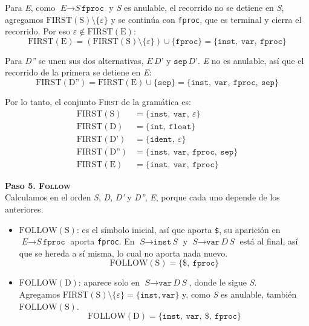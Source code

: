 \documentclass[12pt,letterpaper]{article}
\newcommand{\nt}[1]{\textit{#1}}
\newcommand{\tk}[1]{\texttt{#1}}
\newcommand{\tx}[1]{\text{#1}}
\newcommand{\First}[1]{\mathrm{FIRST}(#1)}
\newcommand{\Follow}[1]{\mathrm{FOLLOW}(#1)}
\newcommand{\eps}{\varepsilon}
\begin{document}
\begin{enumerate}[label=\arabic*.]
\begin{itemize}
    Para \nt{E}, como $\nt{E}\to\nt{S}\,\tk{fproc}$ y \nt{S} es anulable, el recorrido no se detiene en
    \nt{S}, agregamos $\First{\tx{S}}\setminus\{\eps\}$ y se continúa con \tk{fproc}, que es terminal y cierra
    el recorrido. Por eso $\eps\notin\First{\tx{E}}$:
    \[
    \First{\tx{E}} = (\First{\tx{S}}\setminus\{\eps\}) \cup \{\tk{fproc}\} = \{\tk{inst},\ \tk{var},\ \tk{fproc}\}
    \]
    
    Para \nt{D''} se unen sus dos alternativas, $\nt{E}\,\nt{D'}$ y $\tk{sep}\,\nt{D'}$. \nt{E} no es
    anulable, así que el recorrido de la primera se detiene en \nt{E}:
    \[
    \First{\tx{D''}} = \First{\tx{E}} \cup \{\tk{sep}\} = \{\tk{inst},\ \tk{var},\ \tk{fproc},\ \tk{sep}\}
    \]

    Por lo tanto, el conjunto \textsc{First} de la gramática es:
    \[
    \begin{aligned}
      \First{\tx{S}}   &= \{\tk{inst},\ \tk{var},\ \eps\} \\
      \First{\tx{D}}   &= \{\tk{int},\ \tk{float}\} \\
      \First{\tx{D'}}  &= \{\tk{ident},\ \eps\} \\
      \First{\tx{D''}} &= \{\tk{inst},\ \tk{var},\ \tk{fproc},\ \tk{sep}\} \\
      \First{\tx{E}}   &= \{\tk{inst},\ \tk{var},\ \tk{fproc}\}
    \end{aligned}
    \]

    \bigskip

    \textbf{Paso 5. \textsc{Follow}}\\
    Calculamos en el orden \nt{S}, \nt{D}, \nt{D'} y \nt{D''}, \nt{E}, porque cada uno depende de los
    anteriores.
    \begin{itemize}
    \item $\Follow{\tx{S}}$: es el símbolo inicial, así que aporta \tk{\$}, su aparición en
      $\nt{E}\to\nt{S}\,\tk{fproc}$ aporta \tk{fproc}. En $\nt{S}\to\tk{inst}\,\nt{S}$ y
      $\nt{S}\to\tk{var}\,\nt{D}\,\nt{S}$ está al final, así que se hereda a sí misma, lo cual no aporta
      nada nuevo.
      \[
      \Follow{\tx{S}} = \{\tk{\$},\ \tk{fproc}\}
      \]

    \item $\Follow{\tx{D}}$: aparece solo en $\nt{S}\to\tk{var}\,\nt{D}\,\nt{S}$, donde le sigue \nt{S}.\\
      Agregamos $\First{\tx{S}}\setminus\{\eps\}=\{\tk{inst},\tk{var}\}$ y, como \nt{S} es anulable,
      también $\Follow{\tx{S}}$.
      \[
      \Follow{\tx{D}} = \{\tk{inst},\ \tk{var},\ \tk{\$},\ \tk{fproc}\}
      \]


\end{itemize}
\end{itemize}
\end{enumerate}
\end{document}
